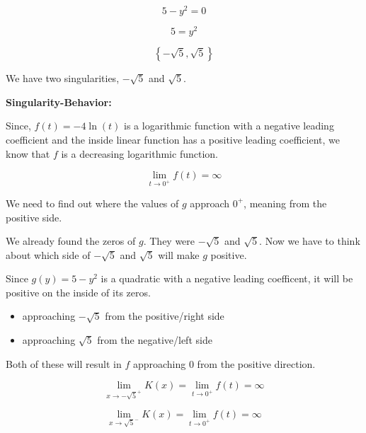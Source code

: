 \documentclass{ximera}
\begin{document}
\[
5 - y^2 = 0
\]



\[
5 = y^2
\]



\[
\left\{ -\sqrt{5}, \sqrt{5} \right\}
\]

We have two singularities, $-\sqrt{5}$ and $\sqrt{5}$. 












\textbf{\textcolor{blue!55!black}{Singularity-Behavior:}} 



Since, $f(t) = -4 \ln(t)$ is a logarithmic function with a negative leading coefficient and the inside linear function has a positive leading coefficient, we know that $f$ is a decreasing logarithmic function.


\[
\lim\limits_{t \to 0^+} f(t) = \infty
\]



We need to find out where the values of $g$ approach $0^+$, meaning from the positive side. 


We already found the zeros of $g$.  They were $-\sqrt{5}$ and $\sqrt{5}$.  Now we have to think about which side of $-\sqrt{5}$ and $\sqrt{5}$ will make $g$ positive. 


Since $g(y) = 5 - y^2$ is a quadratic with a negative leading coefficent, it will be positive on the inside of its zeros. 

\begin{itemize}
\item approaching $-\sqrt{5}$ from the positive/right side
\item approaching $\sqrt{5}$ from the negative/left side
\end{itemize}

Both of these will result in $f$ approaching $0$ from the positive direction. 



\[
\lim\limits_{x \to -\sqrt{5}^+} K(x)  = \lim\limits_{t \to 0^+} f(t) = \infty
\]



\[
\lim\limits_{x \to \sqrt{5}^-} K(x)  = \lim\limits_{t \to 0^+} f(t) = \infty
\]
\end{document}
